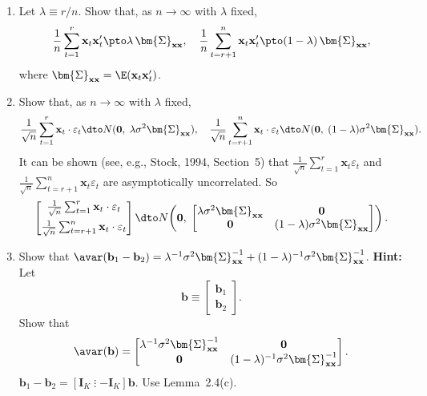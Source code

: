 \begin{problemset}
\begin{enumerate}[label=(\alph*)]
\[\underset{((n-r)\times K)}{\mathbf{X}_2}
= \begin{bmatrix} \mathbf{x}_{r+1}' \\ \vdots \\ \mathbf{x}_n' \end{bmatrix}, \quad
\underset{(2K\times 1)}{\bm{\beta}}
= \begin{bmatrix} \bm{\beta}_1 \\ \bm{\beta}_2 \end{bmatrix}.
\]
The null that $\bm{\beta}_1 = \bm{\beta}_2$ can be written as
$\mathbf{R}\bm{\beta} = \mathbf{r}$ where
$\mathbf{R} = [\mathbf{I}_K \;\vdots\; {-\mathbf{I}_K}]$ and $\mathbf{r} = \mathbf{0}$.
Use Proposition~1.4.

\item Let $\lambda \equiv r/n$. Show that, as $n \to \infty$ with $\lambda$ fixed,
\[
\frac{1}{n}\sum_{t=1}^{r}\mathbf{x}_t\mathbf{x}_t' \pto
\lambda\,\bm{\Sigma}_{\mathbf{xx}}, \quad
\frac{1}{n}\sum_{t=r+1}^{n}\mathbf{x}_t\mathbf{x}_t' \pto
(1-\lambda)\,\bm{\Sigma}_{\mathbf{xx}},
\]
where $\bm{\Sigma}_{\mathbf{xx}} = \E(\mathbf{x}_t\mathbf{x}_t')$.

\item Show that, as $n \to \infty$ with $\lambda$ fixed,
\[
\frac{1}{\sqrt{n}}\sum_{t=1}^{r}\mathbf{x}_t\cdot\varepsilon_t
\dto N(\mathbf{0},\;\lambda\sigma^2\bm{\Sigma}_{\mathbf{xx}}), \quad
\frac{1}{\sqrt{n}}\sum_{t=r+1}^{n}\mathbf{x}_t\cdot\varepsilon_t
\dto N(\mathbf{0},\;(1-\lambda)\sigma^2\bm{\Sigma}_{\mathbf{xx}}).
\]
It can be shown (see, e.g., Stock, 1994, Section~5) that
$\frac{1}{\sqrt{n}}\sum_{t=1}^{r}\mathbf{x}_t\varepsilon_t$ and
$\frac{1}{\sqrt{n}}\sum_{t=r+1}^{n}\mathbf{x}_t\varepsilon_t$
are asymptotically uncorrelated. So
\[
\begin{bmatrix}
\frac{1}{\sqrt{n}}\sum_{t=1}^{r}\mathbf{x}_t\cdot\varepsilon_t \\[6pt]
\frac{1}{\sqrt{n}}\sum_{t=r+1}^{n}\mathbf{x}_t\cdot\varepsilon_t
\end{bmatrix}
\dto N\!\left(\mathbf{0},\;
\begin{bmatrix}
\lambda\sigma^2\bm{\Sigma}_{\mathbf{xx}} & \mathbf{0} \\
\mathbf{0} & (1-\lambda)\sigma^2\bm{\Sigma}_{\mathbf{xx}}
\end{bmatrix}\right).
\]

\item Show that
$\avar(\mathbf{b}_1 - \mathbf{b}_2)
= \lambda^{-1}\sigma^2\bm{\Sigma}_{\mathbf{xx}}^{-1}
+ (1-\lambda)^{-1}\sigma^2\bm{\Sigma}_{\mathbf{xx}}^{-1}$.
\textbf{Hint:} Let
\[
\mathbf{b} \equiv \begin{bmatrix} \mathbf{b}_1 \\ \mathbf{b}_2 \end{bmatrix}.
\]
Show that
\[
\avar(\mathbf{b}) = \begin{bmatrix}
\lambda^{-1}\sigma^2\bm{\Sigma}_{\mathbf{xx}}^{-1} & \mathbf{0} \\
\mathbf{0} & (1-\lambda)^{-1}\sigma^2\bm{\Sigma}_{\mathbf{xx}}^{-1}
\end{bmatrix}.
\]
$\mathbf{b}_1 - \mathbf{b}_2 = [\mathbf{I}_K \;\vdots\; {-\mathbf{I}_K}]\mathbf{b}$.
Use Lemma~2.4(c).


\end{enumerate}
\end{problemset}
